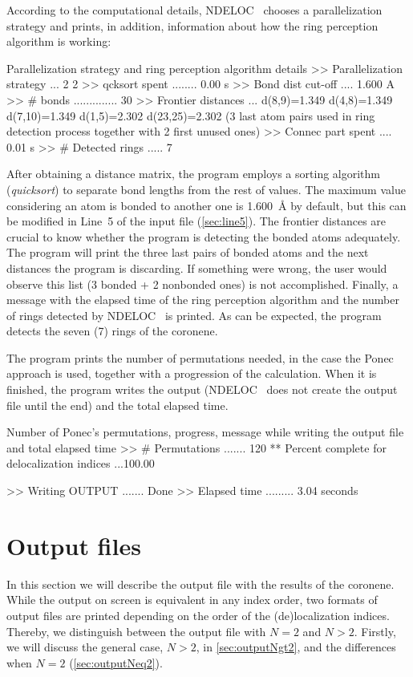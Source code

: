 \documentclass[a4paper,11pt,openany]{memoir}
\newcommand\programa{\textsc{NDELOC}}
\begin{document}
According to the computational details, \programa~ chooses a parallelization strategy and prints, in addition, information about how the ring perception algorithm is working:
\begin{recuadro}{Parallelization strategy and ring perception algorithm details}
>> Parallelization strategy ... 2 2
>> qcksort spent ........ 0.00 s
>> Bond dist cut-off .... 1.600 A
>> # bonds .............. 30
>> Frontier distances ... d(8,9)=1.349 d(4,8)=1.349 d(7,10)=1.349
                          d(1,5)=2.302 d(23,25)=2.302
                          (3 last atom pairs used in ring detection
                           process together with 2 first unused ones)
>> Connec part spent .... 0.01 s
>> # Detected rings ..... 7
\end{recuadro}
After obtaining a distance matrix, the program employs a sorting algorithm (\emph{quicksort}) to separate bond lengths from the rest of values. The maximum value considering an atom is bonded to another one is \SI{1.600}{\angstrom} by default, but this can be modified in Line~5 of the input file (\autoref{sec:line5}). The frontier distances are crucial to know whether the program is detecting the bonded atoms adequately. The program will print the three last pairs of bonded atoms and the next distances the program is discarding. If something were wrong, the user would observe this list (3 bonded + 2 nonbonded ones) is not accomplished. Finally, a message with the elapsed time of the ring perception algorithm and the number of rings detected by \programa~ is printed. As can be expected, the program detects the seven (7) rings of the coronene.

The program prints the number of permutations needed, in the case the Ponec approach is used, together with a progression of the calculation. When it is finished, the program writes the output (\programa~ does not create the output file until the end) and the total elapsed time.
\begin{recuadro}{Number of Ponec's permutations, progress, message while writing the output file and total elapsed time}
>> # Permutations ....... 120
** Percent complete for delocalization indices ...100.00%

>> Writing OUTPUT ....... Done
>> Elapsed time ......... 3.04 seconds
\end{recuadro}

\chapter{Output files}\label{chap:output}
In this section we will describe the output file with the results of the coronene. While the output on screen is equivalent in any index order, two formats of output files are printed depending on the order of the (de)localization indices. Thereby, we distinguish between the output file with $N=2$ and $N>2$. Firstly, we will discuss the general case, $N>2$, in \autoref{sec:outputNgt2}, and the differences when $N=2$ (\autoref{sec:outputNeq2}).
\end{document}
